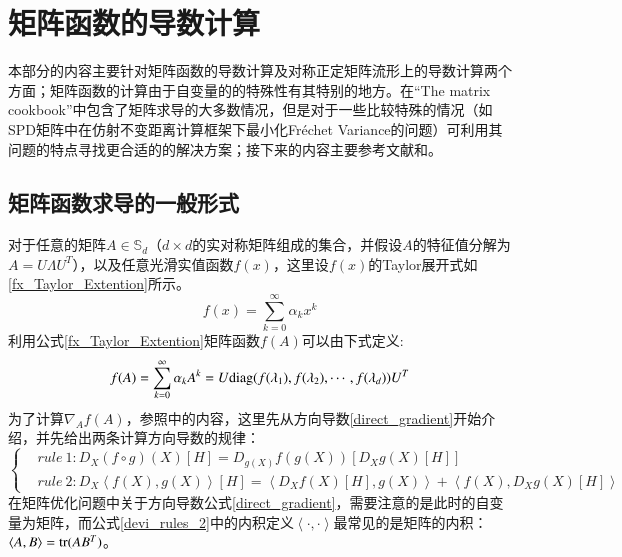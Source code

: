 \section{矩阵函数的导数计算}
本部分的内容主要针对矩阵函数的导数计算及对称正定矩阵流形上的导数计算两个方面；矩阵函数的计算由于自变量的的特殊性有其特别的地方。在“The matrix cookbook”\cite{Matrix_CookBook}中包含了矩阵求导的大多数情况，但是对于一些比较特殊的情况（如SPD矩阵中在仿射不变距离计算框架下最小化Fr\'echet Variance的问题）可利用其问题的特点寻找更合适的的解决方案；接下来的内容主要参考文献\cite{Maniopt_DiscreteCurveFitting}和\cite{Maniopt_book}。
\subsection{矩阵函数求导的一般形式}
\label{sec:matrix_func_devi}
对于任意的矩阵$A \in \mathbb{S}_{d}$（$d\times d$的实对称矩阵组成的集合，并假设$A$的特征值分解为$A=U\Lambda U^{T}$），以及任意光滑实值函数$f(x)$，这里设$f(x)$的Taylor展开式如\ref{fx_Taylor_Extention}所示。
\begin{equation}
\label{fx_Taylor_Extention}
f(x)=\sum_{k=0}^{\infty}\alpha_{k}x^{k}
\end{equation}
利用公式\ref{fx_Taylor_Extention}矩阵函数$f(A)$可以由下式定义:
\begin{equation}
\label{Matrix_Function}
f(A)=\sum_{k=0}^{\infty}\alpha_{k}A^{k}=U{\rm diag}(f(\lambda_1),f(\lambda_2),\cdots,f(\lambda_{d}))U^{T}
\end{equation}
为了计算$\nabla_{A}f(A)$，参照\cite{Maniopt_DiscreteCurveFitting}中的内容，这里先从方向导数\ref{direct_gradient}开始介绍，并先给出两条计算方向导数的规律\cite{Maniopt_DiscreteCurveFitting}：
\begin{equation}
\label{devi_rules_2}
\left\{
\begin{split}
&rule~1:D_{X}(f\circ g)(X)[H]=D_{g(X)}f(g(X))[D_{X}g(X)[H]]\\
&rule~2:D_{X}\left<f(X),g(X)\right>[H]=\left<D_{X}f(X)[H],g(X)\right>+\left<f(X),D_{X}g(X)[H]\right>
\end{split}
\right.
\end{equation}
在矩阵优化问题中关于方向导数公式\ref{direct_gradient}，需要注意的是此时的自变量为矩阵，而公式\ref{devi_rules_2}中的内积定义$\left<\cdot,\cdot\right>$最常见的是矩阵的内积：$\left<A,B\right>={\rm tr}(AB^{T})$。

